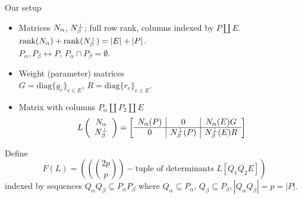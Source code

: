 \documentclass{beamer}
\newcommand{\dunion}{\coprod}
\begin{document}
\begin{frame}{Our setup}
  \begin{itemize}
  \item
    Matrices $N_{\alpha}$, $N_{\beta}^{\perp}$; full row rank, columns indexed by
    $P\dunion E$. $\text{rank}(N_{\alpha})+\text{rank}(N_{\beta}^{\perp})=|E|+|P|$.\\
    $P_{\alpha},P_{\beta}\leftrightarrow P$, $P_{\alpha}\cap P_{\beta}=\emptyset$.
  \item
    Weight (parameter) matrices\\
    $G=\text{diag}\{g_e\}_{e\in E} $,
    $R=\text{diag}\{r_e\}_{e\in E} $.
  \item
    Matrix with columns $P_\alpha \dunion P_2 \dunion E$
    \[
    L\left( \begin{array}{c} N_{\alpha}\\ N_{\beta}^{\perp} \end{array} \right)
    = \left[\begin{array}{c|c|c} N_{\alpha}(P)  &  0  &  N_{\alpha}(E)G \\  \hline
0  & N_{\beta}^{\perp}(P)  &  N_{\beta}^{\perp}(E)R \end{array}\right]
    \]
  \end{itemize}

  Define
  \[
  F(L)=((\binom{2p}{p})-\text{tuple of determinants\ } L[Q_1Q_2E])
  \]
  indexed by sequences $Q_\alpha Q_\beta \subseteq P_\alpha P_\beta$ where
  $Q_\alpha\subseteq P_\alpha$, $Q_\beta\subseteq P_\beta, |Q_\alpha Q_\beta|=p=|P|$.
    
\end{frame}
\end{document}
